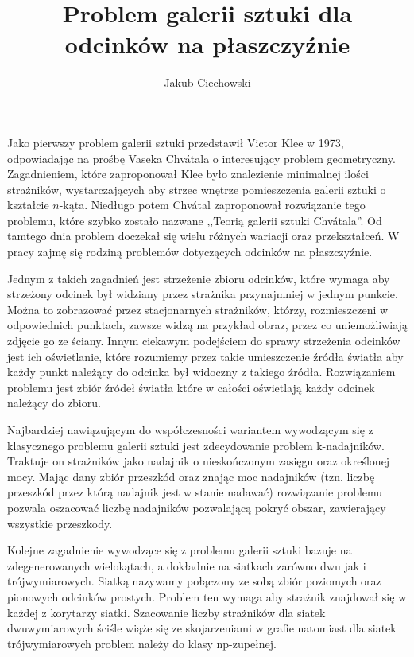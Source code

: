 \documentclass[brudnopis]{xmgr}
\author   {Jakub Ciechowski}
\title    {Problem galerii sztuki dla odcinków na płaszczyźnie}
\date     {\ymdtoday}
\begin{document}

\maketitle

\introduction
Jako pierwszy problem galerii sztuki przedstawił Victor Klee w 1973, odpowiadając na prośbę Vaseka Chv\'atala o interesujący problem geometryczny. Zagadnieniem, które zaproponował Klee było znalezienie minimalnej ilości strażników, wystarczających aby strzec wnętrze pomieszczenia galerii sztuki o kształcie $n$-kąta. Niedługo potem Chv\'atal zaproponował rozwiązanie tego problemu, które szybko zostało nazwane ,,Teorią galerii sztuki Chv\'atala''. Od tamtego dnia problem doczekał się wielu różnych wariacji oraz przekształceń. W pracy zajmę się rodziną problemów dotyczących odcinków na płaszczyźnie. 

Jednym z takich zagadnień jest strzeżenie zbioru odcinków, które wymaga aby strzeżony odcinek był widziany przez strażnika przynajmniej w jednym punkcie. Można to zobrazować przez stacjonarnych strażników, którzy, rozmieszczeni w odpowiednich punktach, zawsze widzą na przykład obraz, przez co uniemożliwiają zdjęcie go ze ściany. Innym ciekawym podejściem do sprawy strzeżenia odcinków jest ich oświetlanie, które  rozumiemy przez takie umieszczenie źródła światła aby każdy punkt należący do odcinka był widoczny z takiego źródła. Rozwiązaniem problemu jest zbiór źródeł światła które w całości oświetlają każdy odcinek należący do zbioru. 

Najbardziej nawiązującym do współczesności wariantem wywodzącym się z klasycznego problemu galerii sztuki jest zdecydowanie problem k-nadajników. Traktuje on strażników jako nadajnik o nieskończonym zasięgu oraz określonej mocy. Mając dany zbiór przeszkód oraz znając moc nadajników (tzn. liczbę przeszkód przez którą nadajnik jest w stanie nadawać) rozwiązanie problemu pozwala oszacować liczbę nadajników pozwalającą pokryć obszar, zawierający wszystkie przeszkody.

Kolejne zagadnienie wywodzące się z problemu galerii sztuki bazuje na zdegenerowanych wielokątach, a dokładnie na siatkach zarówno dwu jak i trójwymiarowych. Siatką nazywamy połączony ze sobą zbiór poziomych oraz pionowych odcinków prostych. Problem ten wymaga aby strażnik znajdował się w każdej z korytarzy siatki. Szacowanie liczby strażników dla siatek dwuwymiarowych ściśle wiąże się ze skojarzeniami w grafie natomiast dla siatek trójwymiarowych problem należy do klasy np-zupełnej.
\end{document}
